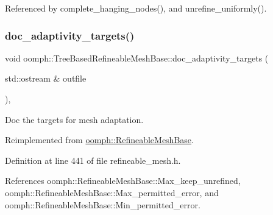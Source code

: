 Referenced by complete\+\_\+hanging\+\_\+nodes(), and unrefine\+\_\+uniformly().

\mbox{\label{classoomph_1_1TreeBasedRefineableMeshBase_a885171376e32cff058ab2fa4df6ca3c6}} 
\subsubsection{\texorpdfstring{doc\+\_\+adaptivity\+\_\+targets()}{doc\_adaptivity\_targets()}}
{\footnotesize\ttfamily void oomph\+::\+Tree\+Based\+Refineable\+Mesh\+Base\+::doc\+\_\+adaptivity\+\_\+targets (\begin{DoxyParamCaption}\item[{std\+::ostream \&}]{outfile }\end{DoxyParamCaption})\hspace{0.3cm}{\ttfamily [inline]}, {\ttfamily [virtual]}}



Doc the targets for mesh adaptation. 



Reimplemented from \hyperlink{classoomph_1_1RefineableMeshBase_a9f54bbde6fbfe2fef719c4d3fa5e0ae7}{oomph\+::\+Refineable\+Mesh\+Base}.



Definition at line 441 of file refineable\+\_\+mesh.\+h.



References oomph\+::\+Refineable\+Mesh\+Base\+::\+Max\+\_\+keep\+\_\+unrefined, oomph\+::\+Refineable\+Mesh\+Base\+::\+Max\+\_\+permitted\+\_\+error, and oomph\+::\+Refineable\+Mesh\+Base\+::\+Min\+\_\+permitted\+\_\+error.

\mbox{\label{classoomph_1_1TreeBasedRefineableMeshBase_a2398683f533e5ba0960fbbe9ff545fb2}} 
